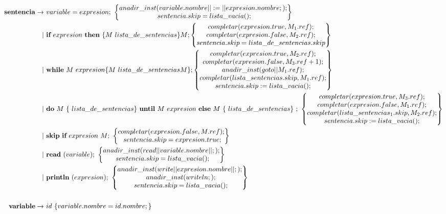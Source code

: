 \documentclass[12pt,a4paper,landscape]{article}
\theoremstyle{mytheor}
\begin{document}
\begin{alignat*}{2}
  \text{\textbf{sentencia}} \to\ & variable = expresion;\ \begin{Bmatrix} anadir\_inst(variable.nombre||:=||expresion.nombre;);\\ sentencia.skip=lista\_vacia();\end{Bmatrix}\\
 |\ &\textbf{if}\ expresion\ \textbf{then}\ \{M\ lista\_de\_sentencias\}M; \begin{Bmatrix} completar(expresion.true,M_1.ref); \\ completar(expresion.false,M_2.ref);\\ sentencia.skip=lista\_de\_sentencias.skip \end{Bmatrix} \\
 |\ &\textbf{while}\ M\ expresion \{M\ lista\_de\_sentencias M\}; \begin{Bmatrix} completar(expresion.true,M_2.ref); \\ completar(expresion.false,M_3.ref+1);\\ anadir\_inst(goto||M_1.ref);\\completar(lista\_sentencias.skip,M_1.ref);\\sentencia.skip:=lista\_vacia(); \end{Bmatrix} \\
 |\ &\textbf{do}\ M\ \{\ lista\_de\_sentencias \}\ \textbf{until}\ M\ expresion\ \textbf{else}\ M\ \{\ lista\_de\_sentencias\}\ ;\ \begin{Bmatrix} completar(expresion.true,M_3.ref); \\ completar(expresion.false,M_1.ref);\\ completar(lista\_sentencias_1.skip,M_2.ref);\\sentencia.skip:=lista\_vacia(); \end{Bmatrix} \\
 |\ &\textbf{skip}\ \textbf{if}\ expresion\ M;\ \begin{Bmatrix} completar(expresion.false,M.ref); \\ sentencia.skip =expresion.true; \end{Bmatrix}\\
 |\ &\textbf{read}\ (variable);\ \begin{Bmatrix} anadir\_inst(read||variable.nombre||;);\\ sentencia.skip=lista\_vacia();\end{Bmatrix}\\
 |\ &\textbf{println} \ (expresion);\  \begin{Bmatrix} anadir\_inst(write||expresion.nombre||;); \\ anadir\_inst(writeln;); \\ sentencia.skip=lista\_vacia(); \end{Bmatrix}\\\\
      \text{\textbf{variable}} \to\ & id\ \{variable.nombre = id.nombre;\} 
\end{alignat*}
\end{document}
